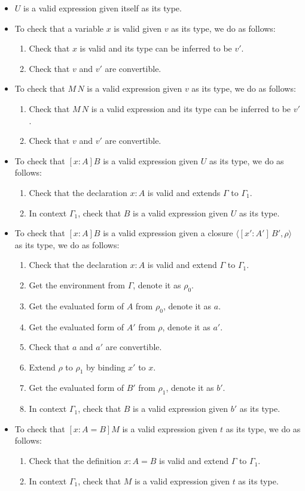 \begin{itemize}
\item $U$ is a valid expression given itself as its type.
\item To check that a variable $x$ is valid given $v$ as its type, we do as follows:
  \begin{enumerate}
  \item Check that $x$ is valid and its type can be inferred to be $v'$.
  \item Check that $v$ and $v'$ are convertible.
  \end{enumerate}
\item To check that $M\,N$ is a valid expression given $v$ as its type, we do as follows:
  \begin{enumerate}
  \item Check that $M\,N$ is a valid expression and its type can be inferred to be $v'$.
  \item Check that $v$ and $v'$ are convertible.
  \end{enumerate}
\item To check that $[x : A] B$ is a valid expression given $U$ as its type, we do as follows:
  \begin{enumerate}
  \item Check that the declaration $x : A$ is valid and extends $\Gamma$ to $\Gamma_1$.
  \item In context $\Gamma_1$, check that $B$ is a valid expression given $U$ as its type.
  \end{enumerate}
\item To check that $[x : A] B$ is a valid expression given a closure $\langle [x' : A'] \, B', \rho \rangle$ as its type, we do as follows:
  \begin{enumerate}
  \item Check that the declaration $x : A$ is valid and extend $\Gamma$ to $\Gamma_1$.
  \item Get the environment from $\Gamma$, denote it as $\rho_0$.
  \item Get the evaluated form of $A$ from $\rho_0$, denote it as $a$.
  \item Get the evaluated form of $A'$ from $\rho$, denote it as $a'$.
  \item Check that $a$ and $a'$ are convertible.
  \item Extend $\rho$ to $\rho_1$ by binding $x'$ to $x$.
  \item Get the evaluated form of $B'$ from $\rho_1$, denote it as $b'$.
  \item In context $\Gamma_1$, check that $B$ is a valid expression given $b'$ as its type.
  \end{enumerate}
\item To check that $[x : A = B] M$ is a valid expression given $t$ as its type, we do as follows:
  \begin{enumerate}
  \item Check that the definition $x : A = B$ is valid and extend $\Gamma$ to $\Gamma_1$.
  \item In context $\Gamma_1$, check that $M$ is a valid expression given $t$ as its type. 
  \end{enumerate}
\end{itemize}
